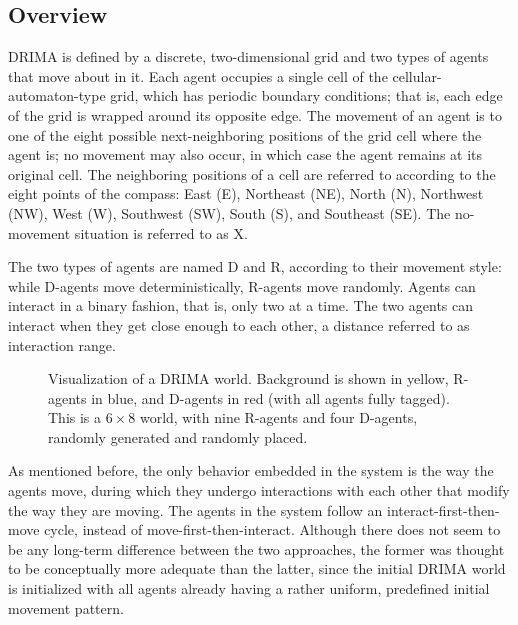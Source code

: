\documentclass[11pt, a4paper]{article}
\begin{document}
\subsection{Overview}

DRIMA is defined by a discrete, two-dimensional grid and two types of agents that move about in it. Each agent occupies a single cell of the cellular-automaton-type grid, which has periodic boundary conditions; that is, each edge of the grid is wrapped around its opposite edge. The movement of an agent is to one of the eight possible next-neighboring positions of the grid cell where the agent is; no movement may also occur, in which case the agent remains at its original cell. The neighboring positions of a cell are referred to according to the eight points of the compass: East (E), Northeast (NE), North (N), Northwest (NW), West (W), Southwest (SW), South (S), and Southeast (SE). The no-movement situation is referred to as X.

The two types of agents are named D and R, according to their movement style: while D-agents move deterministically, R-agents move randomly. Agents can interact in a binary fashion, that is, only two at a time. The two agents can interact when they get close enough to each other, a distance referred to as interaction range.

\begin{figure}[htbp]
\centering
{}
\caption{Visualization of a DRIMA world. Background is shown in yellow, R-agents in blue, and D-agents in red (with all agents fully tagged). This is a $6\times8$ world, with nine R-agents and four D-agents, randomly generated and randomly placed.}
\end{figure}

As mentioned before, the only behavior embedded in the system is the way the agents move, during which they undergo interactions with each other that modify the way they are moving. The agents in the system follow an interact-first-then-move cycle, instead of move-first-then-interact. Although there does not seem to be any long-term difference between the two approaches, the former was thought to be conceptually more adequate than the latter, since the initial DRIMA world is initialized with all agents already having a rather uniform, predefined initial movement pattern.
\end{document}
